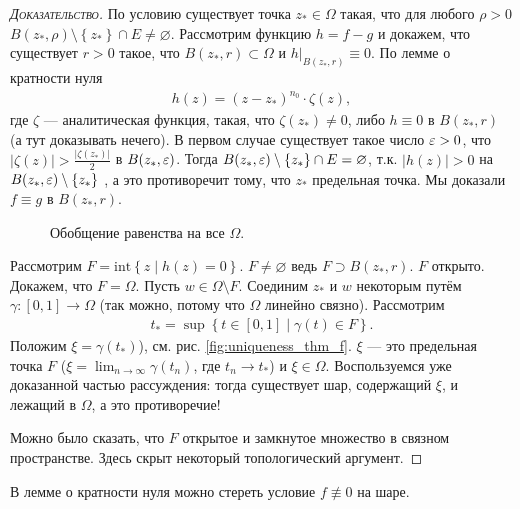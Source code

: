 \documentclass[../complex-analysis.tex]{subfiles}
\begin{document}
\begin{proof}[\normalfont\textsc{Доказательство}]
 По условию существует точка $ z_\ast \in \Omega $ такая, что для любого $ \rho > 0 $ $ B(z_\ast,\rho) \setminus \left\{ z_\ast \right\} \cap E \neq \varnothing $. Рассмотрим функцию $ h = f - g $ и докажем, что существует $ r > 0 $ такое, что $ B(z_\ast,r) \subset \Omega $ и $ h|_{B(z_\ast,r)} \equiv 0 $. По лемме о кратности нуля
 \begin{align}
  \label{equation:uniqueness_thm}
  h(z) = (z - z_\ast)^{n_0} \cdot \zeta(z),
\end{align} где $ \zeta $ --- аналитическая функция, такая, что $ \zeta(z_\ast) \neq 0 $, либо  $ h \equiv 0 $ в $ B(z_\ast,r) $ (а тут доказывать нечего). В первом случае существует такое число  $ \varepsilon > 0 $, что $ \left|\zeta(z) \right| > \frac{\left| \zeta(z_\ast) \right|}{2} $ в $ B(z_\ast,\varepsilon) $. Тогда $ B(z_\ast,\varepsilon) \setminus \left\{ z_\ast \right\} \cap E = \varnothing $, т.к. $\left|h(z)\right| > 0$ на $B(z_\ast, \varepsilon) \setminus \{z_\ast\}$  , а это противоречит тому, что $z_\ast$ предельная точка. Мы доказали $ f \equiv g $ в $ B(z_\ast,r) $.

\begin{figure}[ht]
    \centering
    \caption{Обобщение равенства на все $\Omega$. }
    \label{fig:uniqueness_thm_f}
\end{figure}

 Рассмотрим $ F = \mathrm{int} \left\{ z \mid h(z) = 0 \right\} $. $ F \neq \varnothing $ ведь $ F \supset B(z_\ast,r) $. $ F $ открыто. Докажем, что $ F = \Omega $. Пусть $ w \in \Omega \setminus F$. Соединим $ z_\ast $ и $ w $ некоторым путём $ \gamma\colon[0,1] \to \Omega $ (так можно, потому что $ \Omega $ линейно связно). Рассмотрим
 \begin{align*}
  t_\ast = \sup \left\{ t \in [0,1] \mid \gamma(t) \in F \right\}.
\end{align*}  Положим $ \xi = \gamma(t_\ast) $), см. рис. \eqref{fig:uniqueness_thm_f}. $ \xi $ --- это предельная точка $ F $ ($ \xi = \lim_{n \to \infty} \gamma(t_n) $, где $ t_n \to t_\ast $)  и $ \xi \in \Omega $. Воспользуемся уже доказанной частью рассуждения: тогда существует шар, содержащий $ \xi $, и лежащий в $ \Omega $, а это противоречие!

 Можно было сказать, что $ F $ открытое и замкнутое множество в связном пространстве. Здесь скрыт некоторый топологический аргумент.
\end{proof}
\begin{remrk}
 В лемме о кратности нуля можно стереть условие $ f \not\equiv 0 $ на шаре.
\end{remrk}
\end{document}
